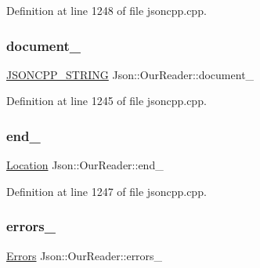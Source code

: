 Definition at line 1248 of file jsoncpp.\+cpp.

\hypertarget{class_json_1_1_our_reader_a726230af83d22d25e0c76cec3408ecf1}{}\label{class_json_1_1_our_reader_a726230af83d22d25e0c76cec3408ecf1} 
\subsubsection{\texorpdfstring{document\+\_\+}{document\_}}
{\footnotesize\ttfamily \hyperlink{config_8h_a1e723f95759de062585bc4a8fd3fa4be}{J\+S\+O\+N\+C\+P\+P\+\_\+\+S\+T\+R\+I\+NG} Json\+::\+Our\+Reader\+::document\+\_\+\hspace{0.3cm}{\ttfamily [private]}}



Definition at line 1245 of file jsoncpp.\+cpp.

\hypertarget{class_json_1_1_our_reader_ab1f69b0260c27a0d2d65dc56e42c8f9d}{}\label{class_json_1_1_our_reader_ab1f69b0260c27a0d2d65dc56e42c8f9d} 
\subsubsection{\texorpdfstring{end\+\_\+}{end\_}}
{\footnotesize\ttfamily \hyperlink{class_json_1_1_our_reader_a1bdc7bbc52ba87cae6b19746f2ee0189}{Location} Json\+::\+Our\+Reader\+::end\+\_\+\hspace{0.3cm}{\ttfamily [private]}}



Definition at line 1247 of file jsoncpp.\+cpp.

\hypertarget{class_json_1_1_our_reader_afb76b68ba1ab68fe09cf2838e3d4898d}{}\label{class_json_1_1_our_reader_afb76b68ba1ab68fe09cf2838e3d4898d} 
\subsubsection{\texorpdfstring{errors\+\_\+}{errors\_}}
{\footnotesize\ttfamily \hyperlink{class_json_1_1_our_reader_a8cc69593ef7303e58e99bb5dbb767562}{Errors} Json\+::\+Our\+Reader\+::errors\+\_\+\hspace{0.3cm}{\ttfamily [private]}}



